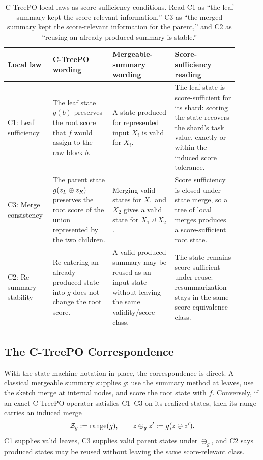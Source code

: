 \begin{table}[t]
\centering
\scriptsize
\setlength{\tabcolsep}{3pt}
\begin{tabular}{@{}p{0.16\linewidth}p{0.24\linewidth}p{0.25\linewidth}p{0.25\linewidth}@{}}
\toprule
Local law & C-TreePO wording & Mergeable-summary wording & Score-sufficiency reading \\
\midrule
C1: Leaf sufficiency &
The leaf state \(g(b)\) preserves the root score that \(f\) would assign to the
raw block \(b\). &
A state produced for represented input \(X_i\) is valid for \(X_i\). &
The leaf state is score-sufficient for its shard: scoring the state recovers
the shard's task value, exactly or within the induced score tolerance. \\
C3: Merge consistency &
The parent state \(g(z_L\oplus z_R)\) preserves the root score of the union
represented by the two children. &
Merging valid states for \(X_1\) and \(X_2\) gives a valid state for
\(X_1\uplus X_2\). &
Score sufficiency is closed under state merge, so a tree of local merges
produces a score-sufficient root state. \\
C2: Re-summary stability &
Re-entering an already-produced state into \(g\) does not change the root
score. &
A valid produced summary may be reused as an input state without leaving the
same validity/score class. &
The state remains score-sufficient under reuse: resummarization stays in the
same score-equivalence class. \\
\bottomrule
\end{tabular}
\caption{C-TreePO local laws as score-sufficiency conditions.  Read C1 as
``the leaf summary kept the score-relevant information,'' C3 as ``the merged
summary kept the score-relevant information for the parent,'' and C2 as
``reusing an already-produced summary is stable.''}
\label{tab:v6-local-laws-sketch-link}
\end{table}

\subsection{The C-TreePO Correspondence}
\label{app:v6-ctreepo-correspondence}

With the state-machine notation in place, the correspondence is direct.  A
classical mergeable summary supplies \(g\): use the summary method at leaves,
use the sketch merge at internal nodes, and score the root state with \(f\).
Conversely, if an exact C-TreePO operator satisfies C1--C3 on its realized
states, then its range carries an induced merge
\[
  \mathcal{Z}_g:=\operatorname{range}(g),\qquad
  z\oplus_g z' := g(z\oplus z').
\]
C1 supplies valid leaves, C3 supplies valid parent states under \(\oplus_g\),
and C2 says produced states may be reused without leaving the same
score-relevant class.

